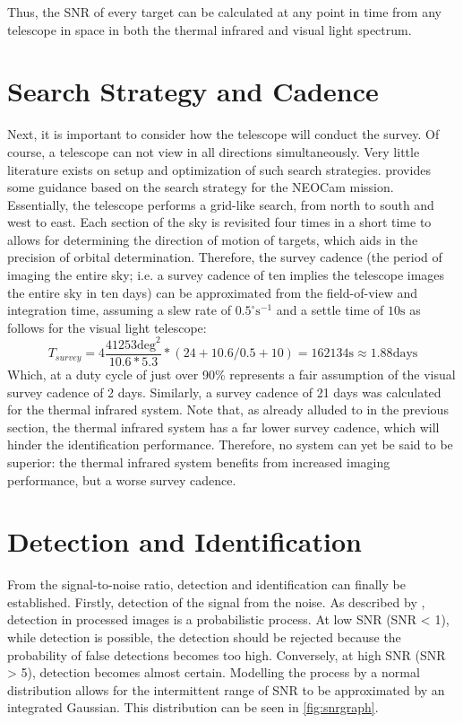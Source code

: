 Thus, the SNR of every target can be calculated at any point in time from any telescope in space in both the thermal infrared and visual light spectrum.

\section{Search Strategy and Cadence}
\label{sec:modelling_cadence}
Next, it is important to consider how the telescope will conduct the survey. Of course, a telescope can not view in all directions simultaneously. Very little literature exists on setup and optimization of such search strategies. \cite{Cadence} provides some guidance based on the search strategy for the NEOCam mission. Essentially, the telescope performs a grid-like search, from north to south and west to east. Each section of the sky is revisited four times in a short time to allows for determining the direction of motion of targets, which aids in the precision of orbital determination. Therefore, the survey cadence (the period of imaging the entire sky; i.e. a survey cadence of ten implies the telescope images the entire sky in ten days) can be approximated from the field-of-view and integration time, assuming a slew rate of $0.5^\circ\mathrm{s}^{-1}$ and a settle time of $10 \mathrm{s}$ as follows for the visual light telescope:
\begin{equation}
 T_{survey} = 4\frac{41253 \mathrm{deg}^2}{10.6 * 5.3} * (24 + 10.6/0.5 + 10) = 162134 \mathrm{s} \approx 1.88 \mathrm{days}
\end{equation}
Which, at a duty cycle of just over 90\% represents a fair assumption of the visual survey cadence of 2 days. Similarly, a survey cadence of 21 days was calculated for the thermal infrared system. Note that, as already alluded to in the previous section, the thermal infrared system has a far lower survey cadence, which will hinder the identification performance. Therefore, no system can yet be said to be superior: the thermal infrared system benefits from increased imaging performance, but a worse survey cadence.

\section{Detection and Identification}
\label{sec:modelling_identification}

From the signal-to-noise ratio, detection and identification can finally be established. Firstly, detection of the signal from the noise. As described by \cite{2017NEOSDT}, detection in processed images is a probabilistic process. At low SNR (SNR < 1), while detection is possible, the detection should be rejected because the probability of false detections becomes too high. Conversely, at high SNR (SNR > 5), detection becomes almost certain. Modelling the process by a normal distribution allows for the intermittent range of SNR to be approximated by an integrated Gaussian. This distribution can be seen in \autoref{fig:snrgraph}. \\

